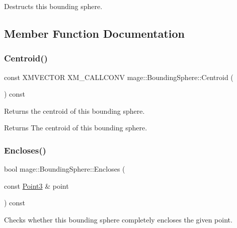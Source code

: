 Destructs this bounding sphere. 

\subsection{Member Function Documentation}
\hypertarget{classmage_1_1_bounding_sphere_ae31660bd7333227d3f5e75b3243b8263}{}\label{classmage_1_1_bounding_sphere_ae31660bd7333227d3f5e75b3243b8263} 
\subsubsection{\texorpdfstring{Centroid()}{Centroid()}}
{\footnotesize\ttfamily const X\+M\+V\+E\+C\+T\+OR X\+M\+\_\+\+C\+A\+L\+L\+C\+O\+NV mage\+::\+Bounding\+Sphere\+::\+Centroid (\begin{DoxyParamCaption}{ }\end{DoxyParamCaption}) const\hspace{0.3cm}{\ttfamily [noexcept]}}

Returns the centroid of this bounding sphere.

\begin{DoxyReturn}{Returns}
The centroid of this bounding sphere. 
\end{DoxyReturn}
\hypertarget{classmage_1_1_bounding_sphere_a7a6e27ec28a95caaef46f633b21af54e}{}\label{classmage_1_1_bounding_sphere_a7a6e27ec28a95caaef46f633b21af54e} 
\subsubsection{\texorpdfstring{Encloses()}{Encloses()}\hspace{0.1cm}{\footnotesize\ttfamily [1/4]}}
{\footnotesize\ttfamily bool mage\+::\+Bounding\+Sphere\+::\+Encloses (\begin{DoxyParamCaption}\item[{const \hyperlink{structmage_1_1_point3}{Point3} \&}]{point }\end{DoxyParamCaption}) const\hspace{0.3cm}{\ttfamily [noexcept]}}

Checks whether this bounding sphere completely encloses the given point.


